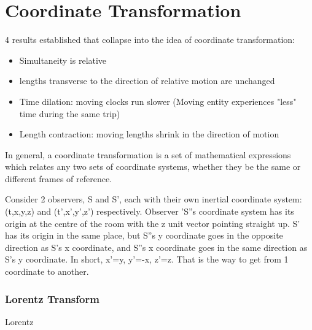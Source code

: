 \documentclass[10pt]{report}
\begin{document}
{\section{Coordinate Transformation}
\par{ 4 results established that collapse into the idea of coordinate transformation:
	\begin{itemize}
		\item{Simultaneity is relative}
		\item{lengths transverse to the direction of relative motion are unchanged}
		\item{Time dilation: moving clocks run slower (Moving entity experiences "less" time during the same trip)}
		\item{Length contraction: moving lengths shrink in the direction of motion}
	\end{itemize}
In general, a coordinate transformation is a set of mathematical expressions which relates any two sets of coordinate systems, whether they be the same or different frames of reference. }
\par{Consider 2 observers, S and S', each with their own inertial coordinate system:(t,x,y,z) and (t',x',y',z') respectively. Observer 'S''s coordinate system has its origin at the centre of the room with the z unit vector pointing straight up. S' has its origin in the same place, but S''s y coordinate goes in the opposite direction as S's x coordinate, and S''s x coordinate goes in the same direction as S's y coordinate. In short, x'=y, y'=-x, z'=z. That is the way to get from 1 coordinate to another.
}
\subsubsection{Lorentz Transform}
\par{Lorentz}

}
\end{document}
